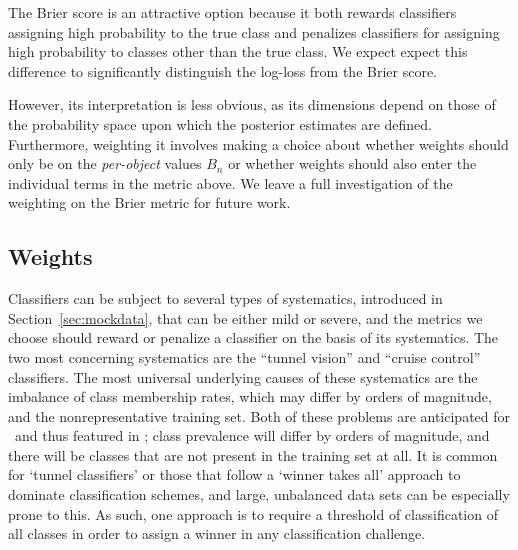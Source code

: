 The Brier score is an attractive option because it both rewards classifiers assigning high probability to the true class and penalizes classifiers for assigning high probability to classes other than the true class.
We expect expect this difference to significantly distinguish the log-loss from the Brier score.

However, its interpretation is less obvious, as its dimensions depend on those of the probability space upon which the posterior estimates are defined.
Furthermore, weighting it involves making a choice about whether weights should only be on the \textit{per-object} values $B_{n}$ or whether weights should also enter the individual terms in the metric above. We leave a full investigation of the weighting on the Brier metric for future work.



%

\subsection{Weights}
\label{sec:weights}

Classifiers can be subject to several types of systematics, introduced in Section~\ref{sec:mockdata}, that can be either mild or severe, and the metrics we choose should reward or penalize a classifier on the basis of its systematics.
The two most concerning systematics are the ``tunnel vision'' and ``cruise control'' classifiers.
The most universal underlying causes of these systematics are the imbalance of class membership rates, which may differ by orders of magnitude, and the nonrepresentative training set.
Both of these problems are anticipated for \lsst\ and thus featured in \plasticc; class prevalence will differ by orders of magnitude, and there will be classes that are not present in the training set at all.
It is common for `tunnel classifiers' or those that follow a `winner takes all' approach to dominate classification schemes, and large, unbalanced data sets can be especially prone to this.
As such, one approach is to require a threshold of classification of all classes in order to assign a winner in any classification challenge.

